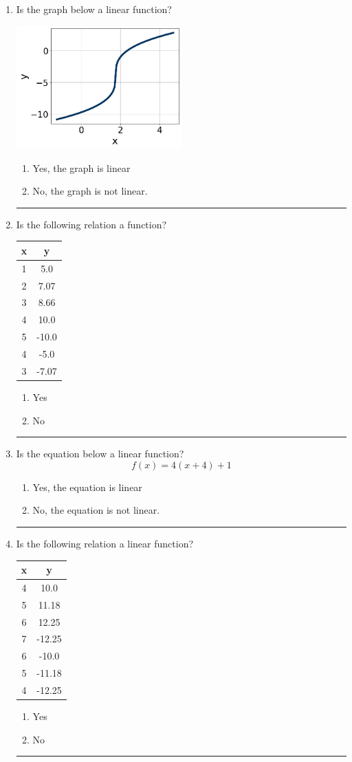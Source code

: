 \documentclass[14pt]{extbook}
\newcommand{\litem}[1]{\item#1\hspace*{-1cm}\rule{\textwidth}{0.4pt}}
\begin{document}
\begin{enumerate}
\litem{
Is the graph below a linear function?
\begin{center}
    \includegraphics[width=0.5\textwidth]{../Figures/MA_8_F_1_2_graphN.png}
\end{center}
\begin{enumerate}[label=\Alph*.]
\item Yes, the graph is linear
\item No, the graph is not linear.

\end{enumerate} }
\litem{
Is the following relation a function?

\begin{tabular}{c|c}
x &y\tabularnewline \hline
1 &5.0\tabularnewline \hline
2 &7.07\tabularnewline \hline
3 &8.66\tabularnewline \hline
4 &10.0\tabularnewline \hline
5 &-10.0\tabularnewline \hline
4 &-5.0\tabularnewline \hline
3 &-7.07\end{tabular}\begin{enumerate}[label=\Alph*.]
\item Yes
\item No

\end{enumerate} }
\litem{
Is the equation below a linear function?\[ f(x) = 4(x + 4)+1 \]\begin{enumerate}[label=\Alph*.]
\item Yes, the equation is linear
\item No, the equation is not linear.

\end{enumerate} }
\litem{
Is the following relation a linear function?

\begin{tabular}{c|c}
x &y\tabularnewline \hline
4 &10.0\tabularnewline \hline
5 &11.18\tabularnewline \hline
6 &12.25\tabularnewline \hline
7 &-12.25\tabularnewline \hline
6 &-10.0\tabularnewline \hline
5 &-11.18\tabularnewline \hline
4 &-12.25\end{tabular}\begin{enumerate}[label=\Alph*.]
\item Yes
\item No

\end{enumerate} }
\end{enumerate}
\end{document}
